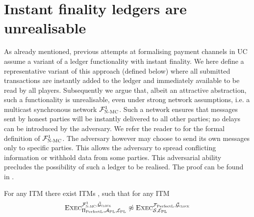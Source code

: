 \section{Instant finality ledgers are unrealisable}
\label{sec:perfect-ledger}
  As already mentioned, previous attempts at formalising payment channels in
  UC~\cite{DBLP:conf/ccs/DziembowskiFH18,Malavolta:2017:CPP:3133956.3134096,sprites,perun}
  assume a variant of a ledger functionality with instant finality. We here
  define a representative variant of this approach \perfectledger{} (defined
  below) where all submitted transactions are instantly added to the ledger and
  immediately available to be read by all players. Subsequently we argue that,
  albeit an attractive abstraction, such a functionality is unrealisable, even
  under strong network assumptions, i.e. a multicast synchronous network
  $\mathcal{F}_{\textsc{N-MC}}^1$. Such a network ensures that messages sent by honest parties
  will be instantly delivered to all other parties; no delays can be introduced
  by the adversary. We refer the reader to  for the formal definition of $\mathcal{F}_{\textsc{N-MC}}^1$. The
  adversary however may choose to send its own messages only to specific
  parties. This allows the adversary to spread conflicting information or
  withhold data from some parties. This adversarial ability precludes the
  possibility of such a ledger to be realised. The  proof can
  be found in .

  \begin{theorem}
    \label{theorem:perfectledger}
    For any ITM \perfectprot{} there exist ITMs \perfectenv,
    \perfectadv{} such that for any ITM \simulator
    \begin{equation*}
      \textsc{Exec}^{\mathcal{F}_{\textsc{N-MC}}^1, \bar{\mathcal{G}}_{\textsc{clock}}}_{\Pi_{\mathrm{PerfectL}},
      \mathcal{A}_{\mathrm{PL}}, \mathcal{E}_{\mathrm{PL}}} \not\approx
      \textsc{Exec}^{\mathcal{F}_{\mathrm{PerfectL}}, \bar{\mathcal{G}}_{\textsc{clock}}}_{\mathcal{S},
      \mathcal{E}_{\mathrm{PL}}}
    \end{equation*}
  \end{theorem}

